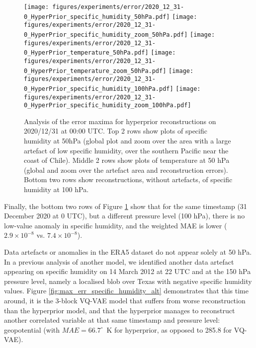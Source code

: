\documentclass[11pt, a4paper, logo, copyright, numbering]{googledeepmind}
\begin{document}
\begin{figure}
    \centering
    \texttt{[image: figures/experiments/error/2020\_12\_31-0\_HyperPrior\_specific\_humidity\_50hPa.pdf]}
    \texttt{[image: figures/experiments/error/2020\_12\_31-0\_HyperPrior\_specific\_humidity\_zoom\_50hPa.pdf]}
    \texttt{[image: figures/experiments/error/2020\_12\_31-0\_HyperPrior\_temperature\_50hPa.pdf]}
    \texttt{[image: figures/experiments/error/2020\_12\_31-0\_HyperPrior\_temperature\_zoom\_50hPa.pdf]}
    \texttt{[image: figures/experiments/error/2020\_12\_31-0\_HyperPrior\_specific\_humidity\_100hPa.pdf]}
    \texttt{[image: figures/experiments/error/2020\_12\_31-0\_HyperPrior\_specific\_humidity\_zoom\_100hPa.pdf]}
    \hspace*{-2em}
    \caption{Analysis of the error maxima for hyperprior reconstructions on 2020/12/31 at 00:00 UTC. Top 2 rows show plots of specific humidity at 50hPa (global plot and zoom over the area with a large artefact of low specific humidity, over the southern Pacific near the coast of Chile). Middle 2 rows show plots of temperature at 50 hPa (global and zoom over the artefact area and reconstruction errors). Bottom two rows show reconstructions, without artefacts, of specific humidity at 100 hPa.}
    \label{fig:max_err_specific_humidity_hyperprior}
\end{figure}

Finally, the bottom two rows of Figure \ref{fig:max_err_specific_humidity_hyperprior} show that for the same timestamp (31 December 2020 at 0 UTC), but a different pressure level (100 hPa), there is no low-value anomaly in specific humidity, and the weighted MAE is lower ($2.9 \times 10^{-8}$ vs. $7.4 \times 10^{-8}$).

Data artefacts or anomalies in the ERA5 dataset do not appear solely at 50 hPa. In a previous analysis of another model, we identified another data artefact appearing on specific humidity on 14 March 2012 at 22 UTC and at the 150 hPa pressure level, namely a localised blob over Texas with negative specific humidity values. Figure \ref{fig:max_err_specific_humidity_alt} demonstrates that this time around, it is the 3-block VQ-VAE model that suffers from worse reconstruction than the hyperprior model, and that the hyperprior manages to reconstruct another correlated variable at that same timestamp and pressure level: geopotential (with $MAE = 66.7^\circ$~K for hyperprior, as opposed to 285.8 for VQ-VAE).
\end{document}
